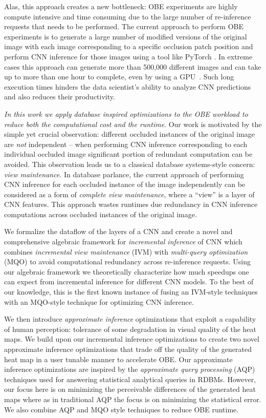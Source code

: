 Alas, this approach creates a new bottleneck: OBE experiments are highly compute intensive and time consuming due to the large number of re-inference requests that needs to be performed.
The current approach to perform OBE experiments is to generate a large number of modified versions of the original image with each image corresponding to a specific occlusion patch position and perform CNN inference for those images using a tool like PyTorch \cite{ketkar2017introduction}.
In extreme cases this approach can generate more than 500,000 different images and can take up to more than one hour to complete, even by using a GPU~\cite{zintgraf2017visualizing}.
Such long execution times hinders the data scientist's ability to analyze CNN predictions and also reduces their productivity.

\textit{In this work we apply database inspired optimizations to the OBE workload to reduce both the computational cost and the runtime}.
Our work is motivated by the simple yet crucial observation: different occluded instances of the original image are \textit{not} independent -- when performing CNN inference corresponding to each individual occluded image significant portion of redundant computation can be avoided.
This observation leads us to a classical database systems-style concern: \textit{view maintenance}.
In database parlance, the current approach of performing CNN inference for each occluded instance of the image independently can be considered as a form of \textit{complete view maintenance}, where a ``view'' is a layer of CNN features.
This approach wastes runtimes due redundancy in CNN inference computations across occluded instances of the original image. 

We formalize the dataflow of the layers of a CNN and create a novel and comprehensive algebraic framework for \textit{incremental inference} of CNN which combines \textit{incremental view maintenance} (IVM) \cite{chirkova2012materialized,gupta1995maintenance,levy1995answering} with \textit{multi-query optimization} (MQO) to avoid computational redundancy across re-inference requests.
Using our algebraic framework we theoretically characterize how much speedups one can expect from incremental inference for different CNN models.
To the best of our knowledge, this is the  first known instance of fusing an IVM-style techniques with an MQO-style technique for optimizing CNN inference.

We then introduce \textit{approximate inference} optimizations that exploit a capability of human perception: tolerance of some degradation in visual quality of the heat maps.
We build upon our incremental inference optimizations to create two novel approximate inference optimizations that trade off the quality of the generated heat map in a user tunable manner to accelerate OBE.
Our approximate inference optimizations are inspired by the \textit{approximate query processing} (AQP) techniques used for answering statistical analytical queries in RDBMs.
However, our focus here is on minimizing the perceivable differences of the generated heat maps where as in traditional AQP the focus is on minimizing the statistical error.
We also combine AQP and MQO style techniques to reduce OBE runtime.


